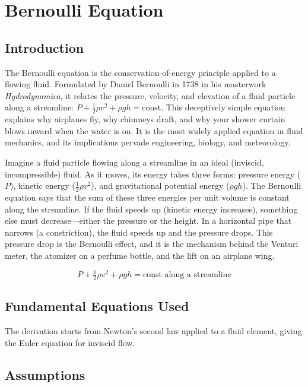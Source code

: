 \chapter{Bernoulli Equation}

\section*{Introduction}

The Bernoulli equation is the conservation-of-energy principle applied to a flowing fluid. Formulated by Daniel Bernoulli in 1738 in his masterwork \textit{Hydrodynamica}, it relates the pressure, velocity, and elevation of a fluid particle along a streamline: $P + \frac{1}{2}\rho v^2 + \rho gh = \text{const}$. This deceptively simple equation explains why airplanes fly, why chimneys draft, and why your shower curtain blows inward when the water is on. It is the most widely applied equation in fluid mechanics, and its implications pervade engineering, biology, and meteorology.

Imagine a fluid particle flowing along a streamline in an ideal (inviscid, incompressible) fluid. As it moves, its energy takes three forms: pressure energy ($P$), kinetic energy ($\frac{1}{2}\rho v^2$), and gravitational potential energy ($\rho gh$). The Bernoulli equation says that the sum of these three energies per unit volume is constant along the streamline. If the fluid speeds up (kinetic energy increases), something else must decrease---either the pressure or the height. In a horizontal pipe that narrows (a constriction), the fluid speeds up and the pressure drops. This pressure drop is the Bernoulli effect, and it is the mechanism behind the Venturi meter, the atomizer on a perfume bottle, and the lift on an airplane wing.


\begin{equation}
P + \tfrac{1}{2}\rho v^2 + \rho gh = \text{const along a streamline}
\end{equation}

\section*{Fundamental Equations Used}

The derivation starts from Newton's second law applied to a fluid element, giving the Euler equation for inviscid flow.

\section*{Assumptions}

